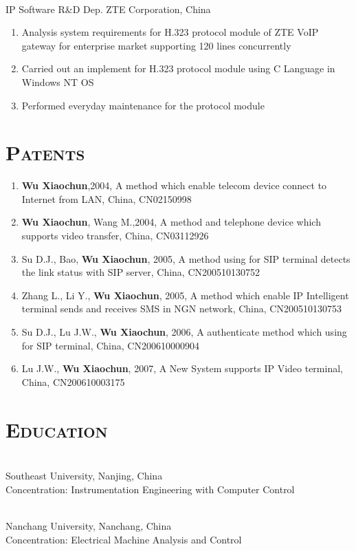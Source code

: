 \documentclass[margin,11pt]{res}
\begin{document}
\begin{resume}
     \\
    IP Software R\&D Dep. ZTE Corporation, China
     \begin{enumerate}\itemsep -2pt %
     \item Analysis system requirements for H.323 protocol module of ZTE VoIP gateway for enterprise
       market supporting 120 lines concurrently
     \item Carried out an implement for H.323 protocol module using C Language in Windows NT OS
     \item Performed everyday maintenance for the protocol module
     \end{enumerate} 

\section{{\textsc{Patents}}}

\begin{enumerate}
\item \textbf{Wu Xiaochun},2004, A method which enable telecom device connect to Internet from LAN,
  China, CN02150998
\item \textbf{Wu Xiaochun}, Wang M.,2004, A method and telephone device which supports video
  transfer, China, CN03112926
\item Su D.J., Bao, \textbf{Wu Xiaochun}, 2005, A method using for SIP terminal detects the link
  status with SIP server, China, CN200510130752
\item Zhang L., Li Y., \textbf{Wu Xiaochun}, 2005, A method which enable IP Intelligent terminal
  sends and receives SMS in NGN network, China, CN200510130753
\item Su D.J., Lu J.W., \textbf{Wu Xiaochun}, 2006, A authenticate method which using for SIP
  terminal, China, CN200610000904
\item Lu J.W., \textbf{Wu Xiaochun}, 2007, A New System supports IP Video terminal, China,
  CN200610003175
\end{enumerate}

\section{\textsc{Education}} 
  \\
Southeast University, Nanjing, China \\
Concentration: Instrumentation Engineering with Computer Control

 \\
Nanchang University, Nanchang, China \\
Concentration: Electrical Machine Analysis and Control
 
\end{resume}
\end{document}
